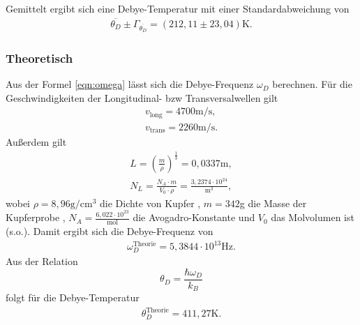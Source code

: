 Gemittelt ergibt sich eine Debye-Temperatur mit einer Standardabweichung von
\begin{align*}
  \overline{\theta_D} \pm \Gamma_{\overline{\theta_D}} = (212,11 \pm 23,04)\text{K}.
  \end{align*}

\subsubsection{Theoretisch}
Aus der Formel \eqref{eqn:omega} lässt sich die Debye-Frequenz $\omega_D$ berechnen.
Für die Geschwindigkeiten der Longitudinal- bzw Transversalwellen gilt \cite{skript}
\begin{align*}
  v_{\text{long}} = 4700\text{m{/s}}, \\
  v_{\text{trans}} = 2260\text{m/s}.
\end{align*}
Außerdem gilt
\begin{gather*}
  L = \left({\frac{m}{\rho}}\right)^{\frac{1}{3}} = 0,0337\text{m}, \\
  N_L = \frac{N_A \cdot m}{V_0 \cdot \rho} = \frac{3,2374\cdot10^{24}}{\text{m}^3},
\end{gather*}
wobei $\rho = 8,96 \text{g}/\text{cm}^3$ die Dichte von Kupfer \cite{cu}, $m = 342$g die Masse der Kupferprobe \cite{skript},
$N_A = \frac{6,022\cdot10^{23}}{\text{mol}}$ die Avogadro-Konstante \cite{dem} und $V_0$ das Molvolumen ist (s.o.).
Damit ergibt sich die Debye-Frequenz von
\begin{align*}
  \omega_D^{\text{Theorie}} = 5,3844\cdot10^{13}\text{Hz}.
\end{align*}
Aus der Relation
\begin{equation}
  \theta_D = \frac{\hbar\omega_D}{k_B}
\end{equation}
folgt für die Debye-Temperatur
\begin{align*}
  \theta_D^{\text{Theorie}} = 411,27\text{K}.
\end{align*}
